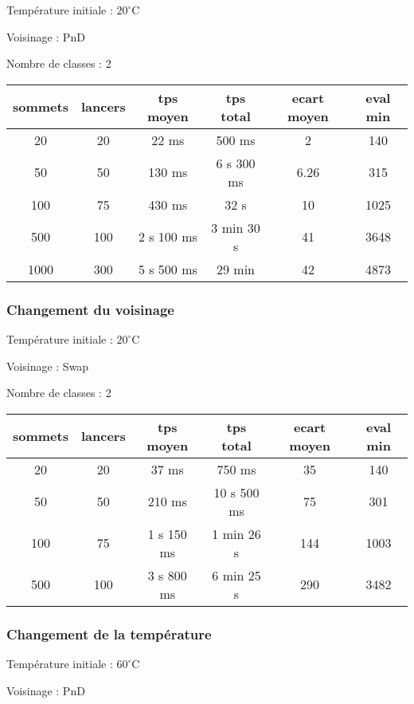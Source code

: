 \documentclass[12pt]{article}
\begin{document}
\bigskip
Température initiale : $20^\circ$C

Voisinage : PnD

Nombre de classes : 2
\bigskip

\begin{tabular}{|c|c|c|c|c|c|}
	\hline 
	sommets & lancers & tps moyen & tps total & ecart moyen & eval min\\
	\hline
	20 & 20 & 22 ms & 500 ms & 2 & 140 \\
	\hline
	 50  &  50  &   130  ms   &   6 s  300  ms   &   6.26  &   315  \\
	\hline
	 100  &  75  &   430  ms   &  32 s  &  10   &   1025  \\
	\hline
	 500  &  100  & 2 s 100 ms  &  3 min 30  s &  41  &   3648  \\
	\hline
	1000  &  300  &  5 s 500 ms &  29 min &  42   &   4873  \\
	\hline
\end{tabular}
\bigskip

\subsubsection*{Changement du voisinage}

Température initiale : $20^\circ$C

Voisinage : Swap

Nombre de classes : 2
\bigskip

\begin{tabular}{|c|c|c|c|c|c|}
	\hline 
	sommets & lancers & tps moyen & tps total & ecart moyen & eval min\\
	\hline
	20 & 20 & 37 ms & 750 ms & 35 & 140 \\
	\hline
	 50  &  50  &   210  ms   &   10 s  500  ms   &  75   &   301  \\
	\hline
	 100  &  75  & 1 s 150  ms   &  1 min 26 s &  144   &   1003  \\
	\hline
	 500  &  100  & 3 s 800  ms  &  6 min 25  s &   290  &   3482  \\
	\hline
\end{tabular}
\bigskip

\subsubsection*{Changement de la température}

Température initiale : $60^\circ$C

Voisinage : PnD
\end{document}
